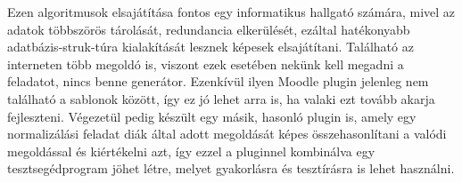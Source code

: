 Ezen algoritmusok elsajátítása fontos egy informatikus hallgató számára, mivel az adatok többszörös tárolását, redundancia elkerülését, ezáltal hatékonyabb adatbázis-struk-túra kialakítását lesznek képesek elsajátítani. Található az interneten több megoldó is, viszont ezek esetében nekünk kell megadni a feladatot, nincs benne generátor. Ezenkívül ilyen Moodle plugin jelenleg nem található a sablonok között, így ez jó lehet arra is, ha valaki ezt tovább akarja fejleszteni. Végezetül pedig készült egy másik, hasonló plugin is, amely egy normalizálási feladat diák által adott megoldását képes összehasonlítani a valódi megoldással és kiértékelni azt, így ezzel a pluginnel kombinálva egy tesztsegédprogram jöhet létre, melyet gyakorlásra és tesztírásra is lehet használni.
